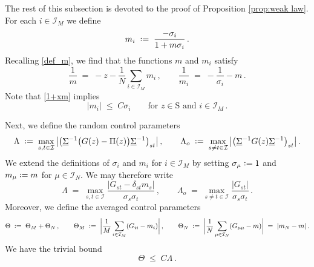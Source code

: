 \documentclass[11pt]{article} %
\numberwithin{equation}{section}
\numberwithin{figure}{section}
\theoremstyle{plain} %
\theoremstyle{definition} %
\newcommand{\f}[1]{\boldsymbol{\mathrm{#1}}} %
\renewcommand{\cal}{\mathcal}
\newcommand{\ul}[1]{\underline{#1} \!\,} %
\newcommand*{\deq}{\mathrel{\vcenter{\baselineskip0.65ex \lineskiplimit0pt \hbox{.}\hbox{.}}}=}
\renewcommand{\leq}{\leqslant}
\newcommand{\pb}[1]{\bigl({#1}\bigr)}
\newcommand{\abs}[1]{\lvert #1 \rvert}
\newcommand{\absb}[1]{\bigl\lvert #1 \bigr\rvert}
\newcommand{\absbb}[1]{\biggl\lvert #1 \biggr\rvert}
\begin{document}
The rest of this subsection is devoted to the proof of Proposition \ref{prop:weak law}. For each $i \in \cal I_M$ we define
\begin{equation} \label{def_m_i}
m_i \;\deq\; \frac{- \sigma_i}{1 + m \sigma_i}\,.
\end{equation}
Recalling \eqref{def_m}, we find that the functions $m$ and $m_i$ satisfy
\begin{equation*}
\frac{1}{m} \;=\; -z - \frac{1}{N} \sum_{i \in \cal I_M} m_i \,, \qquad \frac{1}{m_i} \;=\; - \frac{1}{\sigma_i} - m\,.
\end{equation*}
Note that \eqref{1+xm} implies
\begin{equation} \label{m_i_bound}
\abs{m_i} \;\leq\; C \sigma_i \qquad \text{for } z \in \f S \text{ and } i \in \cal I_M\,.
\end{equation}


Next, we define the random control parameters
\begin{equation*}
\Lambda \;\deq\; \max_{s,t \in \cal I} \, \absb{\pb{\ul \Sigma^{-1} \pb{G(z) - \Pi(z)} \ul \Sigma^{-1}}_{st}}\,,
\qquad
\Lambda_o \;\deq\; \max_{s \neq t \in \cal I} \, \absb{\pb{\ul \Sigma^{-1} G(z) \ul \Sigma^{-1}}_{st}}\,.
\end{equation*}
We extend the definitions of $\sigma_i$ and $m_i$ for $i \in \cal I_M$ by setting $\sigma_\mu \deq 1$ and $m_\mu \deq m$ for $\mu \in \cal I_N$.
We may therefore write
\begin{equation*}
\Lambda \;=\; \max_{s,t \in \cal I} \frac{\abs{G_{st} - \delta_{st} m_s}}{\sigma_s \sigma_t}\,, \qquad
\Lambda_o \;=\; \max_{s \neq t \in \cal I} \frac{\abs{G_{st}}}{\sigma_s \sigma_t}\,.
\end{equation*}
Moreover, we define the averaged control parameters
\begin{equation*}
\Theta \;\deq\; \Theta_M + \Theta_N \,, \qquad \Theta_M \;\deq\; \absbb{\frac{1}{M} \sum_{i \in \cal I_M} (G_{ii} - m_i)} \,, \qquad \Theta_N \;\deq\; \absbb{\frac{1}{N} \sum_{\mu \in \cal I_N} (G_{\mu \mu} - m)} \;=\; \abs{m_N - m}
\,.
\end{equation*}
We have the trivial bound
\begin{equation} \label{Theta_leq_Lambda}
\Theta \;\leq\; C \Lambda\,.
\end{equation}
\end{document}
